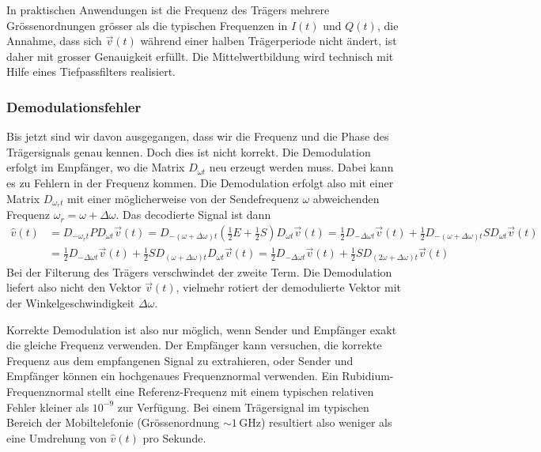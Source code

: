 In praktischen Anwendungen ist die Frequenz des Trägers mehrere
Grössenordnungen grösser als die typischen Frequenzen in $I(t)$ 
und $Q(t)$, die Annahme, dass sich $\vec{v}(t)$ während einer halben
Trägerperiode nicht ändert, ist daher mit grosser Genauigkeit erfüllt.
Die Mittelwertbildung wird technisch mit Hilfe eines Tiefpassfilters
realisiert.

\subsubsection{Demodulationsfehler}
Bis jetzt sind wir davon ausgegangen, dass wir die Frequenz und die
Phase des Trägersignals genau kennen.
Doch dies ist nicht korrekt.
Die Demodulation erfolgt im Empfänger, wo die Matrix $D_{\omega t}$
neu erzeugt werden muss.
Dabei kann es zu Fehlern in der Frequenz kommen.
Die Demodulation erfolgt also mit einer Matrix $D_{\omega_rt}$
mit einer möglicherweise von der Sendefrequenz $\omega$
abweichenden Frequenz $\omega_r=\omega+\Delta\omega$.
Das decodierte Signal ist dann
\begin{equation}
\begin{aligned}
\hat{v}(t)
&=
D_{-\omega_rt}PD_{\omega t}\vec{v}(t)
=
D_{-(\omega+\Delta\omega)t} ({\textstyle\frac12}E+{\textstyle\frac12}S)
D_{\omega t}\vec{v}(t)
=
\frac12D_{-\Delta\omega t}\vec{v}(t)
+
\frac12D_{-(\omega+\Delta\omega)t}SD_{\omega t}\vec{v}(t)
\\
&=
\frac12 D_{-\Delta\omega t}\vec{v}(t)
+
\frac12 SD_{(\omega +\Delta\omega) t}D_{\omega t}\vec{v}(t)
=
\frac12 D_{-\Delta\omega t}\vec{v}(t)
+
\frac12 SD_{(2\omega +\Delta\omega) t}\vec{v}(t)
\end{aligned}
\label{eqn:qam:demoomegar}
\end{equation}
Bei der Filterung des Trägers verschwindet der zweite Term.
Die Demodulation liefert also nicht den Vektor $\vec{v}(t)$, vielmehr
rotiert der demodulierte Vektor mit der Winkelgeschwindigkeit $\Delta\omega$.

Korrekte Demodulation ist also nur möglich, wenn Sender und Empfänger exakt
die gleiche Frequenz verwenden.
Der Empfänger kann versuchen, die korrekte Frequenz aus dem empfangenen
Signal zu extrahieren, oder Sender und Empfänger können ein hochgenaues
Frequenznormal verwenden.
Ein Rubidium-Frequenznormal stellt eine Referenz-Frequenz mit einem
typischen relativen Fehler kleiner als $10^{-9}$ zur Verfügung.
Bei einem Trägersignal im typischen Bereich der Mobiltelefonie (Grössenordnung
$\sim 1\,\text{GHz}$) resultiert also weniger als eine Umdrehung von $\hat{v}(t)$
pro Sekunde.

